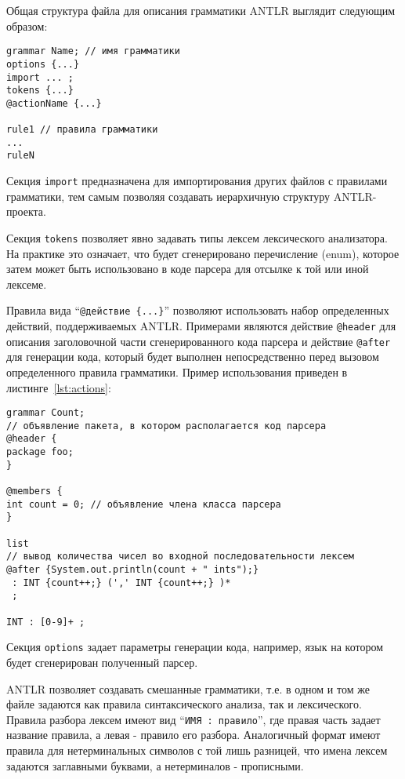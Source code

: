 Общая структура файла для описания грамматики ANTLR выглядит следующим образом:

\begin{lstlisting}[caption={Структура грамматики ANTLR}]
grammar Name; // имя грамматики
options {...}
import ... ;
tokens {...}
@actionName {...}

rule1 // правила грамматики
...
ruleN
\end{lstlisting}

Секция \texttt{import} предназначена для импортирования других файлов с
правилами грамматики, тем самым позволяя создавать иерархичную структуру
ANTLR-проекта.

Секция \texttt{tokens} позволяет явно задавать типы лексем лексического
анализатора. На практике это означает, что будет сгенерировано перечисление
(enum), которое затем может быть использовано в коде парсера для отсылке к той
или иной лексеме.

Правила вида ``\texttt{@действие \{...\}}'' позволяют использовать набор
определенных действий, поддерживаемых ANTLR. Примерами являются действие
\texttt{@header} для описания заголовочной части сгенерированного кода парсера и
действие \texttt{@after} для генерации кода, который будет выполнен
непосредственно перед вызовом определенного правила грамматики. Пример
использования приведен в листинге~\ref{lst:actions}:

\begin{lstlisting}[caption={Использование действий ANTLR}, label={lst:actions}]
grammar Count;
// объявление пакета, в котором располагается код парсера
@header {
package foo;
}

@members {
int count = 0; // объявление члена класса парсера
}

list
// вывод количества чисел во входной последовательности лексем
@after {System.out.println(count + " ints");}
 : INT {count++;} (',' INT {count++;} )*
 ;

INT : [0-9]+ ;
\end{lstlisting}

Секция \texttt{options} задает параметры генерации кода, например, язык на
котором будет сгенерирован полученный парсер.

ANTLR позволяет создавать смешанные грамматики, т.е. в одном и том же файле
задаются как правила синтаксического анализа, так и лексического. Правила
разбора лексем имеют вид ``\texttt{ИМЯ : правило}'', где правая часть задает
название правила, а левая - правило его разбора. Аналогичный формат имеют
правила для нетерминальных символов с той лишь разницей, что имена лексем
задаются заглавными буквами, а нетерминалов - прописными.

